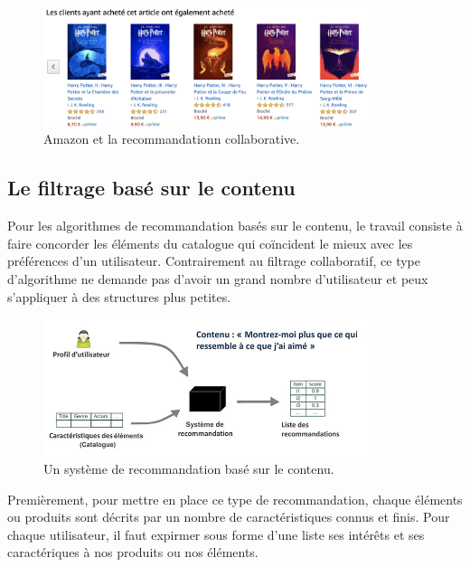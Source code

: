 \begin{figure}[htp]
  \centering
  \includegraphics[width=95mm]{./src_img/rs-collaboratif-sample}
  \caption{Amazon et la recommandationn collaborative.}
  \label{fig:duoB}
\end{figure}

\vspace{5mm}




\subsection{Le filtrage basé sur le contenu}

Pour les algorithmes de recommandation basés sur le contenu, le travail consiste à faire concorder les éléments du catalogue qui coïncident le mieux avec les préférences d'un utilisateur. Contrairement au filtrage collaboratif, ce type d'algorithme ne demande pas d'avoir un grand nombre d'utilisateur et peux s'appliquer à des structures plus petites. 

\vspace{5mm}


\begin{figure}[htp]
  \centering
  \includegraphics[width=95mm]{./src_img/rs-content}
  \caption{Un système de recommandation basé sur le contenu\supercite{RSIntro}.}
  \label{fig:trio}
\end{figure}

\vspace{5mm}


Premièrement, pour mettre en place ce type de recommandation, chaque éléments ou produits sont décrits par un nombre de caractéristiques connus et finis. Pour chaque utilisateur, il faut expirmer sous forme d'une liste ses intérêts et ses caractériques à nos produits ou nos éléments. 


